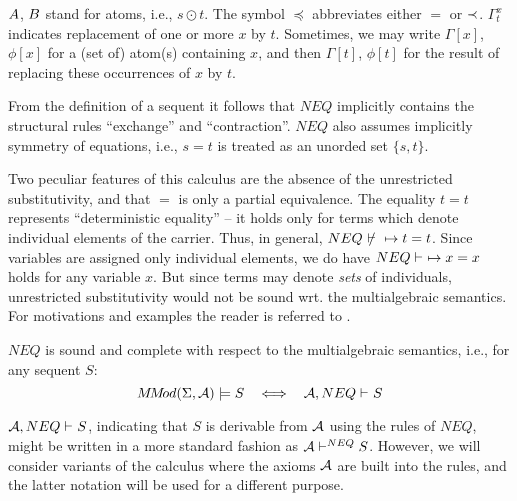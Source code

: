 \noindent
$A$, $B$ stand for atoms, i.e., $s\odot t$.
 The symbol $\preceq$ abbreviates either $=$ or $\mathbin{\prec}$. 
$\Gamma_t^x$ indicates replacement of one or more $x$ by $t$.
Sometimes, we may write $\Gamma[x]$, $\phi[x]$ for a (set of) atom(s) containing
$x$, and then $\Gamma[t]$, $\phi[t]$ for the result of replacing these occurrences
of $x$ by $t$.

%
\begin{REMARK} \label{re:1}
{From the definition of a sequent it follows that $NEQ$ implicitly contains the 
structural rules ``exchange'' and ``contraction''.}
$NEQ$ also assumes implicitly symmetry of equations, i.e., $s=t$ is treated as an 
unorded set $\{s,t\}$. 

Two peculiar features of this calculus are the absence of the unrestricted 
substitutivity,
and that $=$ is only a partial equivalence.
  The equality $t=t$ represents ``deterministic equality'' -- it holds only for terms which
denote individual elements of the carrier. Thus, in general, $NEQ\ \not\vdash\ \Seq t=t$. 
Since
variables are assigned only individual elements, we do have $NEQ\vdash\ \mathrel{\mapsto} x=x$ holds for any
variable $x$. But since
terms may denote {\em sets} of individuals, unrestricted substitutivity would not
be sound wrt. the multialgebraic semantics. For motivations and examples the reader
is referred to \cite{WM,Top,Broy}.
\end{REMARK}
%
\begin{THEOREM}\label{th:cmpl} {\em \cite{WM}}
$NEQ$ is sound and complete with respect to the multialgebraic semantics, i.e.,
for any sequent $S$:
\[\MMod(\Sigma,\Ax)\models S \ \ \iff \ \ \der{\Ax, NEQ}{}S\]
\end{THEOREM}
\noindent
 ${{\cal {A}},NEQ}\vdash^{{}}S$,  indicating that $S$ is derivable from ${\cal {A}}$
using the rules of $NEQ$, might be written in a more standard fashion as
 ${\cal {A}}{}\vdash^{{NEQ}}S$. However, we will consider variants of the calculus
 where the axioms ${\cal {A}}$ are built into the rules, and the latter notation will be used
 for a different purpose.

